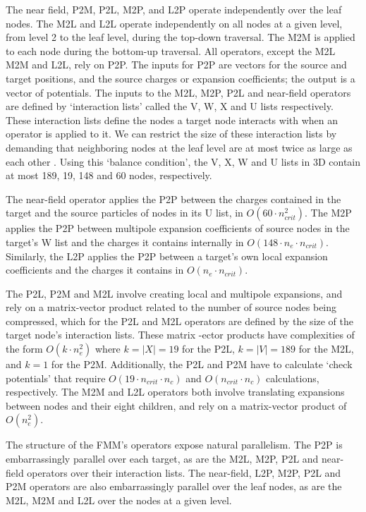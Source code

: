 \documentclass{IEEEcsmag}
\begin{document}
The near field, P2M, P2L, M2P, and L2P operate independently over the leaf nodes. The M2L and L2L operate independently on all nodes at a given level, from level 2 to the leaf level, during the top-down traversal. The M2M is applied to each node during the bottom-up traversal.
All operators, except the M2L M2M and L2L, rely on P2P. The inputs for P2P are vectors for the source and target positions, and the source charges or expansion coefficients; the output is a vector of potentials.
The inputs to the M2L, M2P, P2L and near-field operators are defined by `interaction lists' called the V, W, X and U lists respectively. These interaction lists define the nodes a target node interacts with when an operator is applied to it. We can restrict the size of these interaction lists by demanding that neighboring nodes at the leaf level are at most twice as large as each other \cite{Sundar2007}. Using this `balance condition', the V, X, W and U lists in 3D contain at most 189, 19, 148 and 60 nodes, respectively.

The near-field operator applies the P2P between the charges contained in the target and the source particles of nodes in its U list, in $O(60 \cdot n_{crit}^2)$. The M2P applies the P2P between multipole expansion coefficients of source nodes in the target's W list and the charges it contains internally in $O(148 \cdot n_e \cdot n_{crit})$. Similarly, the L2P applies the P2P between a target's own local expansion coefficients and the charges it contains in $O(n_e \cdot n_{crit})$.

The P2L, P2M and M2L involve creating local and multipole expansions, and rely on a matrix-vector product related to the number of source nodes being compressed, which for the P2L and M2L operators are defined by the size of the target node's interaction lists. These matrix -ector products have complexities of the form $O(k \cdot n_e^2)$ where $k = |X| = 19$ for the P2L, $k = |V| = 189$ for the M2L, and $k = 1$ for the P2M. Additionally, the P2L and P2M have to calculate `check potentials' \cite{Ying2004} that require $O(19 \cdot n_{crit} \cdot n_c)$ and $O(n_{crit} \cdot n_c)$ calculations, respectively. The M2M and L2L operators both involve translating expansions between nodes and their eight children, and rely on a matrix-vector product of $O(n_e^2)$.

The structure of the FMM's operators expose natural parallelism. The P2P is embarrassingly parallel over each target, as are the M2L, M2P, P2L and near-field operators over their interaction lists. The near-field, L2P, M2P, P2L and P2M operators are also embarrassingly parallel over the leaf nodes, as are the M2L, M2M and L2L over the nodes at a given level.
\end{document}
